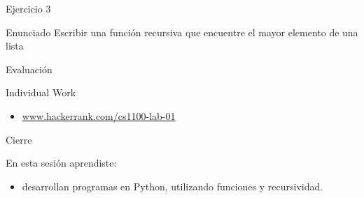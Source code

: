 \documentclass{beamer}
\begin{document}
\begin{frame}[fragile]{Ejercicio 3}
  \begin{block}{Enunciado}
 Escribir una funci\'on recursiva que encuentre el mayor elemento de una lista 
    \end{block}

\end{frame} 



\begin{frame}[fragile]{Evaluaci\'on}
  \begin{exampleblock}{Individual Work}
  \begin{itemize}
  \item \href{www.hackerrank.com/cs1100-lab-01
}{www.hackerrank.com/cs1100-lab-01}
  \end{itemize}
\end{exampleblock}    
\end{frame} 


\begin{frame}[fragile]{Cierre} 
  \begin{block}{En esta sesi\'on aprendiste:}
    \begin{itemize}[<+- | alert@+>]
      \item desarrollan programas en Python, utilizando funciones y recursividad.
    \end{itemize}
  \end{block}
\end{frame}
\end{document}
